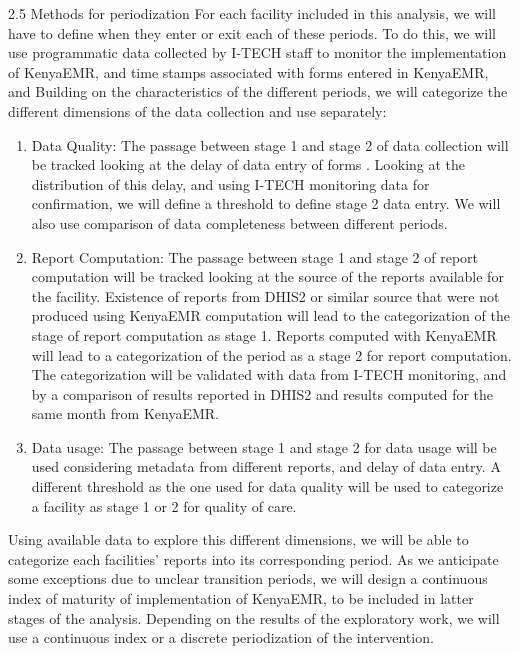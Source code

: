 \documentclass[a4paper,11pt,final,twoside]{article}
\begin{document}


2.5	Methods for periodization
For each facility included in this analysis, we will have to define when they enter or exit each of these periods. To do this, we will use programmatic data collected by I-TECH staff to monitor the implementation of KenyaEMR, and time stamps associated with forms entered in KenyaEMR, and Building on the characteristics of the different periods, we will categorize the different dimensions of the data collection and use separately:
\begin{enumerate}
\item    Data Quality: The passage between stage 1 and stage 2 of data collection will be tracked looking at the delay of data entry of forms . Looking at the distribution of this delay, and using I-TECH monitoring data for confirmation, we will define a threshold to define stage 2 data entry. We will also use comparison of data completeness between different periods.
\item	Report Computation: The passage between stage 1 and stage 2 of report computation will be tracked looking at the source of the reports available for the facility. Existence of reports from DHIS2 or similar source that were not produced using KenyaEMR computation will lead to the categorization of the stage of report computation as stage 1. Reports computed with KenyaEMR will lead to a categorization of the period as a stage 2 for report computation. The categorization will be validated with data from I-TECH monitoring, and by a comparison of results reported in DHIS2 and results computed for the same month from KenyaEMR.
\item	Data usage: The passage between stage 1 and stage 2 for data usage will be used considering metadata from different reports, and delay of data entry. A different threshold as the one used for data quality will be used to categorize a facility as stage 1 or 2 for quality of care.
\end{enumerate}

Using available data to explore this different dimensions, we will be able to categorize each facilities’ reports into its corresponding period. As we anticipate some exceptions due to unclear transition periods, we will design a continuous index of maturity of implementation of KenyaEMR, to be included in latter stages of the analysis. Depending on the results of the exploratory work, we will use a continuous index or a discrete periodization of the intervention.
\end{document}

